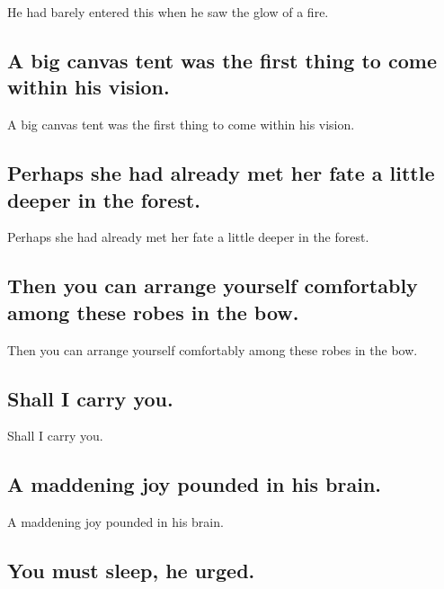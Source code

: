 \documentclass[]{article}
\begin{document}
He had barely entered this when he saw the glow of a fire.

\hypertarget{a-big-canvas-tent-was-the-first-thing-to-come-within-his-vision.}{%
\subsection{A big canvas tent was the first thing to come within his
vision.}\label{a-big-canvas-tent-was-the-first-thing-to-come-within-his-vision.}}

A big canvas tent was the first thing to come within his vision.

\hypertarget{perhaps-she-had-already-met-her-fate-a-little-deeper-in-the-forest.}{%
\subsection{Perhaps she had already met her fate a little deeper in the
forest.}\label{perhaps-she-had-already-met-her-fate-a-little-deeper-in-the-forest.}}

Perhaps she had already met her fate a little deeper in the forest.

\hypertarget{then-you-can-arrange-yourself-comfortably-among-these-robes-in-the-bow.}{%
\subsection{Then you can arrange yourself comfortably among these robes
in the
bow.}\label{then-you-can-arrange-yourself-comfortably-among-these-robes-in-the-bow.}}

Then you can arrange yourself comfortably among these robes in the bow.

\hypertarget{shall-i-carry-you.}{%
\subsection{Shall I carry you.}\label{shall-i-carry-you.}}

Shall I carry you.

\hypertarget{a-maddening-joy-pounded-in-his-brain.}{%
\subsection{A maddening joy pounded in his
brain.}\label{a-maddening-joy-pounded-in-his-brain.}}

A maddening joy pounded in his brain.

\hypertarget{you-must-sleep-he-urged.}{%
\subsection{You must sleep, he urged.}\label{you-must-sleep-he-urged.}}
\end{document}
